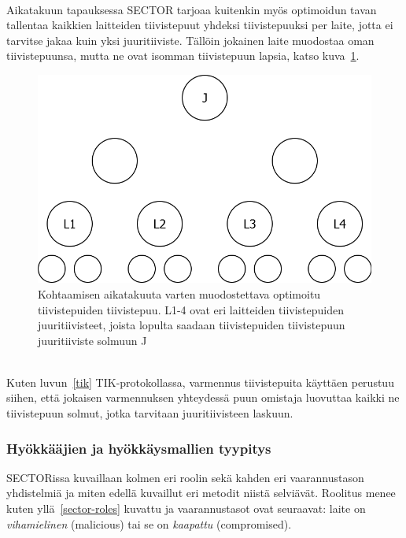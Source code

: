\documentclass[finnish]{tktltiki2}
\theoremstyle{definition}
\theoremstyle{remark}
\begin{document}
\noindent\\
Aikatakuun tapauksessa SECTOR tarjoaa kuitenkin myös optimoidun tavan tallentaa kaikkien laitteiden tiivistepuut yhdeksi tiivistepuuksi per laite, jotta ei tarvitse jakaa kuin yksi juuritiiviste. Tällöin jokainen laite muodostaa oman tiivistepuunsa, mutta ne ovat isomman tiivistepuun lapsia, katso kuva~\ref{fig:sectortrees}.

\begin{figure}[h]
  \centering
  \includegraphics[width=\textwidth]{merkle-puupuu}
  \caption{Kohtaamisen aikatakuuta varten muodostettava optimoitu tiivistepuiden tiivistepuu. L1-4 ovat eri laitteiden tiivistepuiden juuritiivisteet, joista lopulta saadaan tiivistepuiden tiivistepuun juuritiiviste solmuun J}
  \label{fig:sectortrees}
\end{figure}


\noindent\\
Kuten luvun~\ref{tik} TIK-protokollassa, varmennus tiivistepuita käyttäen perustuu siihen, että jokaisen varmennuksen yhteydessä puun omistaja luovuttaa kaikki ne tiivistepuun solmut, jotka tarvitaan juuritiivisteen laskuun.

\subsubsection{Hyökkääjien ja hyökkäysmallien tyypitys}

SECTORissa kuvaillaan kolmen eri roolin sekä kahden eri vaarannustason yhdistelmiä ja miten edellä kuvaillut eri metodit niistä selviävät. Roolitus menee kuten yllä~\ref{sector-roles} kuvattu ja vaarannustasot ovat seuraavat: laite on \emph{vihamielinen} (malicious) tai se on \emph{kaapattu} (compromised).
\end{document}
